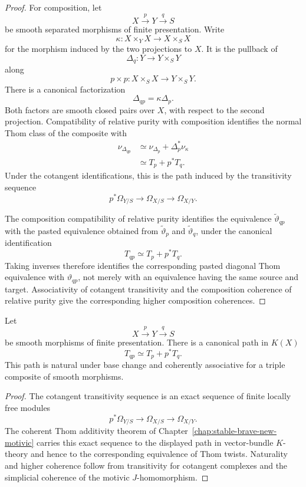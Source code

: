 \begin{proof}
For composition, let
\[
    X\xrightarrow{p}Y\xrightarrow{q}S
\]
be smooth separated morphisms of finite presentation.  Write
\[
    \kappa:
    X\times_YX
    \longrightarrow
    X\times_SX
\]
for the morphism induced by the two projections to \(X\).  It is the
pullback of
\[
    \Delta_q:
    Y\longrightarrow Y\times_SY
\]
along
\[
    p\times p:
    X\times_SX
    \longrightarrow
    Y\times_SY.
\]
There is a canonical factorization
\[
    \Delta_{qp}
    =
    \kappa\Delta_p.
\]
Both factors are smooth closed pairs over \(X\), with respect to the second
projection.  Compatibility of relative purity with composition identifies
the normal Thom class of the composite with
\[
\begin{aligned}
    \nu_{\Delta_{qp}}
    &\simeq
    \nu_{\Delta_p}
    +
    \Delta_p^*\nu_\kappa \\
    &\simeq
    T_p+p^*T_q.
\end{aligned}
\]
Under the cotangent identifications, this is the path induced by the
transitivity sequence
\[
    p^*\Omega_{Y/S}
    \longrightarrow
    \Omega_{X/S}
    \longrightarrow
    \Omega_{X/Y}.
\]

The composition compatibility of relative purity identifies the
equivalence
\(\widetilde\vartheta_{qp}\) with the pasted equivalence obtained from
\(\widetilde\vartheta_p\) and \(\widetilde\vartheta_q\), under the canonical
identification
\[
    T_{qp}
    \simeq
    T_p+p^*T_q.
\]
Taking inverses therefore identifies the corresponding pasted diagonal Thom
equivalence with \(\vartheta_{qp}\), not merely with an equivalence having
the same source and target.  Associativity of cotangent transitivity and
the composition coherence of relative purity give the corresponding higher
composition coherences.
\end{proof}

\begin{proposition}
\label{prop:tangent-class-composition}
Let
\[
    X\xrightarrow{p}Y\xrightarrow{q}S
\]
be smooth morphisms of finite presentation.  There is a canonical path in
\(K(X)\)
\[
    T_{qp}
    \simeq
    T_p+p^*T_q.
\]
This path is natural under base change and coherently associative for a
triple composite of smooth morphisms.
\end{proposition}

\begin{proof}
The cotangent transitivity sequence is an exact sequence of finite locally
free modules
\[
    p^*\Omega_{Y/S}
    \longrightarrow
    \Omega_{X/S}
    \longrightarrow
    \Omega_{X/Y}.
\]
The coherent Thom additivity theorem of
Chapter~\ref{chap:stable-brave-new-motivic} carries this exact sequence to
the displayed path in vector-bundle \(K\)-theory and hence to the
corresponding equivalence of Thom twists.  Naturality and higher coherence
follow from transitivity for cotangent complexes and the simplicial
coherence of the motivic \(J\)-homomorphism.
\end{proof}

